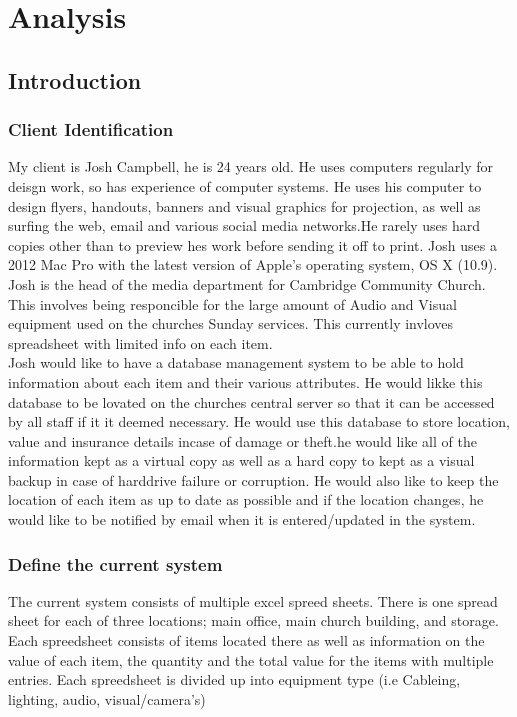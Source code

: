 \documentclass[a4paper,12pt]{report}
\begin{document}
\chapter{Analysis}

\section{Introduction}

\subsection{Client Identification}

My client is Josh Campbell, he is 24 years old. He uses computers regularly for deisgn work, so has experience of computer systems. He uses his computer to design flyers, handouts, banners and visual graphics for projection, as well as surfing the web, email and various social media networks.He rarely uses hard copies other than to preview hes work before sending it off to print. Josh uses a 2012 Mac Pro with the latest version of Apple's operating system, OS X (10.9).\\

\noindent Josh is the head of the media department for Cambridge Community Church. This involves being responcible for the large amount of Audio and Visual equipment used on the churches Sunday services. This currently invloves spreadsheet with limited info on each item. \\

\noindent Josh would like to have a database management system to be able to hold information about each item and their various attributes. He would likke this database to be lovated on the churches central server so that it can be accessed by all staff if it it deemed necessary. He would use this database to store location, value and insurance details incase of damage or theft.he would like all of the information kept as a virtual copy as well as a hard copy to kept as a visual backup in case of harddrive failure or corruption. He would also like to keep the location of each item as up to date as possible and if the location changes, he would like to be notified by email when it is entered/updated in the system.

\subsection{Define the current system}

The current system consists of multiple excel spreed sheets. There is one spread sheet for each of three locations; main office, main church building, and storage. Each spreedsheet consists of items located there as well as information on the value of each item, the quantity and the total value for the items with multiple entries. Each spreedsheet is divided up into equipment type (i.e Cableing, lighting, audio, visual/camera's) 
\end{document}
